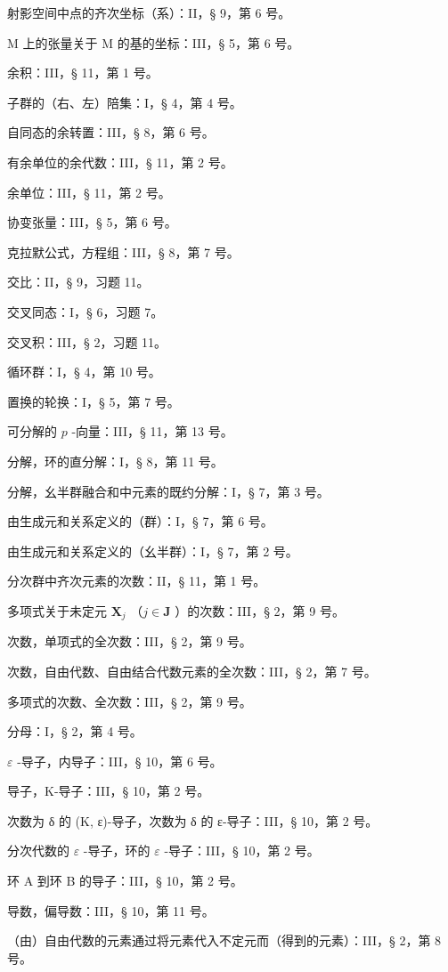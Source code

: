 射影空间中点的齐次坐标（系）：II，§ 9，第 6 号。

M 上的张量关于 M 的基的坐标：III，§ 5，第 6 号。

余积：III，§ 11，第 1 号。

子群的（右、左）陪集：I，§ 4，第 4 号。

自同态的余转置：III，§ 8，第 6 号。

有余单位的余代数：III，§ 11，第 2 号。

余单位：III，§ 11，第 2 号。

协变张量：III，§ 5，第 6 号。

克拉默公式，方程组：III，§ 8，第 7 号。

交比：II，§ 9，习题 11。

交叉同态：I，§ 6，习题 7。

交叉积：III，§ 2，习题 11。

循环群：I，§ 4，第 10 号。

置换的轮换：I，§ 5，第 7 号。

可分解的 \(p\) -向量：III，§ 11，第 13 号。

分解，环的直分解：I，§ 8，第 11 号。

分解，幺半群融合和中元素的既约分解：I，§ 7，第 3 号。

由生成元和关系定义的（群）：I，§ 7，第 6 号。

由生成元和关系定义的（幺半群）：I，§ 7，第 2 号。

分次群中齐次元素的次数：II，§ 11，第 1 号。

多项式关于未定元 \(\mathbf{X}_j\) （\(j\in \mathbf{J}\) ）的次数：III，§ 2，第 9 号。

次数，单项式的全次数：III，§ 2，第 9 号。

次数，自由代数、自由结合代数元素的全次数：III，§ 2，第 7 号。

多项式的次数、全次数：III，§ 2，第 9 号。

分母：I，§ 2，第 4 号。

\(\varepsilon\) -导子，内导子：III，§ 10，第 6 号。

导子，K-导子：III，§ 10，第 2 号。

次数为 δ 的 (K, ε)-导子，次数为 δ 的 ε-导子：III，§ 10，第 2 号。

分次代数的 \(\varepsilon\) -导子，环的 \(\varepsilon\) -导子：III，§ 10，第 2 号。

环 A 到环 B 的导子：III，§ 10，第 2 号。

导数，偏导数：III，§ 10，第 11 号。

（由）自由代数的元素通过将元素代入不定元而（得到的元素）：III，§ 2，第 8 号。

